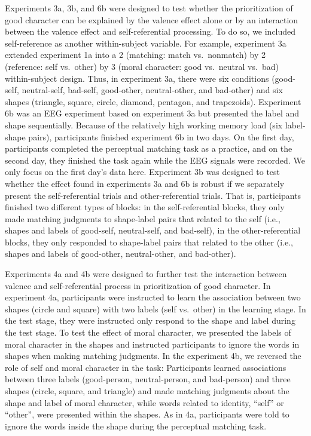 \documentclass[
  man]{apa6}
\begin{document}
Experiments 3a, 3b, and 6b were designed to test whether the prioritization of good character can be explained by the valence effect alone or by an interaction between the valence effect and self-referential processing. To do so, we included self-reference as another within-subject variable. For example, experiment 3a extended experiment 1a into a 2 (matching: match vs.~nonmatch) by 2 (reference: self vs.~other) by 3 (moral character: good vs.~neutral vs.~bad) within-subject design. Thus, in experiment 3a, there were six conditions (good-self, neutral-self, bad-self, good-other, neutral-other, and bad-other) and six shapes (triangle, square, circle, diamond, pentagon, and trapezoids). Experiment 6b was an EEG experiment based on experiment 3a but presented the label and shape sequentially. Because of the relatively high working memory load (six label-shape pairs), participants finished experiment 6b in two days. On the first day, participants completed the perceptual matching task as a practice, and on the second day, they finished the task again while the EEG signals were recorded. We only focus on the first day's data here. Experiment 3b was designed to test whether the effect found in experiments 3a and 6b is robust if we separately present the self-referential trials and other-referential trials. That is, participants finished two different types of blocks: in the self-referential blocks, they only made matching judgments to shape-label pairs that related to the self (i.e., shapes and labels of good-self, neutral-self, and bad-self), in the other-referential blocks, they only responded to shape-label pairs that related to the other (i.e., shapes and labels of good-other, neutral-other, and bad-other).

Experiments 4a and 4b were designed to further test the interaction between valence and self-referential process in prioritization of good character. In experiment 4a, participants were instructed to learn the association between two shapes (circle and square) with two labels (self vs.~other) in the learning stage. In the test stage, they were instructed only respond to the shape and label during the test stage. To test the effect of moral character, we presented the labels of moral character in the shapes and instructed participants to ignore the words in shapes when making matching judgments. In the experiment 4b, we reversed the role of self and moral character in the task: Participants learned associations between three labels (good-person, neutral-person, and bad-person) and three shapes (circle, square, and triangle) and made matching judgments about the shape and label of moral character, while words related to identity, ``self'' or ``other'', were presented within the shapes. As in 4a, participants were told to ignore the words inside the shape during the perceptual matching task.
\end{document}
